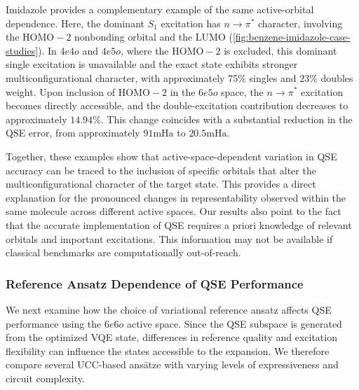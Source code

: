 Imidazole provides a complementary example of the same active-orbital dependence. 
Here, the dominant $S_1$ excitation has $n \rightarrow \pi^{*}$ character, involving the $\mathrm{HOMO}-2$ nonbonding orbital and the $\mathrm{LUMO}$ (\cref{fig:benzene-imidazole-case-studies}).
In $4e4o$ and $4e5o$, where the $\mathrm{HOMO}-2$ is excluded, this dominant single excitation is unavailable and the exact state exhibits stronger multiconfigurational character, with approximately $75\%$ singles and $23\%$ doubles weight. 
Upon inclusion of $\mathrm{HOMO}-2$ in the $6e5o$ space, the $n \rightarrow \pi^{*}$ excitation becomes directly accessible, and the double-excitation contribution decreases to approximately $14.94\%$.
This change coincides with a substantial reduction in the QSE error, from approximately $91 \mathrm{mHa}$ to $20.5 \mathrm{mHa}$.

Together, these examples show that active-space-dependent variation in QSE accuracy can be traced to the inclusion of specific orbitals that alter the multiconfigurational character of the target state. 
This provides a direct explanation for the pronounced changes in representability observed within the same molecule across different active spaces. Our results also point to the fact that the accurate implementation of QSE requires a priori knowledge of relevant orbitals and important excitations. This information may not be available if classical benchmarks are computationally out-of-reach. 

\subsubsection{Reference Ansatz Dependence of QSE Performance}
We next examine how the choice of variational reference ansatz affects QSE performance using the $6e6o$ active space. 
Since the QSE subspace is generated from the optimized VQE state, differences in reference quality and excitation flexibility can influence the states accessible to the expansion. 
We therefore compare several UCC-based ansätze with varying levels of expressiveness and circuit complexity.

\label{sec:ansatz-dependence}


